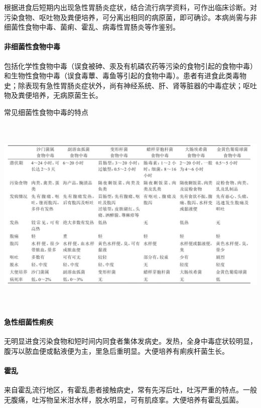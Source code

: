 根据进食后短期内出现急性胃肠炎症状，结合流行病学资料，可作出临床诊断。对污染食物、呕吐物及粪便培养，可分离出相同的病原菌，即可确诊。本病尚需与非细菌性食物中毒、菌痢、霍乱、病毒性胃肠炎等作鉴别。

\paragraph{非细菌性食物中毒}

包括化学性食物中毒（误食被砷、汞及有机磷农药等污染的食物引起的食物中毒）和生物性食物中毒（误食毒蕈、毒鱼等引起的食物中毒）。患者有进食此类毒物史；除表现有急性胃肠炎症状外，尚有神经系统、肝、肾等脏器的中毒症状；呕吐物及粪便培养，无病原菌生长。

\begin{table}[htbp]
\centering
\caption{常见细菌性食物中毒的特点}
\label{tab62-1}
\includegraphics[width=6.72917in,height=3.75in]{./images/Image00236.jpg}
\end{table}

\paragraph{急性细菌性痢疾}

无明显进食污染食物和短时间内同食者集体发病史。发热，全身中毒症状较明显，腹泻以脓血便或黏液便为主，里急后重明显。大便培养有痢疾杆菌生长。

\paragraph{霍乱}

来自霍乱流行地区，有霍乱患者接触病史，常有先泻后吐，吐泻严重的特点。一般无腹痛，吐泻物呈米泔水样，脱水明显，可有肌痉挛。大便培养有霍乱弧菌。


